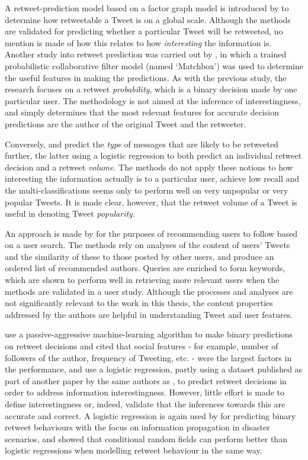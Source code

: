 A retweet-prediction model based on a factor graph model is introduced by \citet{yang10} to determine how retweetable a Tweet is on a global scale. Although the methods are validated for predicting whether a particular Tweet will be retweeted, no mention is made of how this relates to how \textit{interesting} the information is. Another study into retweet prediction was carried out by \citet{zaman10}, in which a trained probabilistic collaborative filter model (named `Matchbox') was used to determine the useful features in making the predictions. As with the previous study, the research focuses on a retweet \textit{probability}, which is a binary decision made by one particular user. The methodology is not aimed at the inference of interestingness, and simply determines that the most relevant features for accurate decision predictions are the author of the original Tweet and the retweeter.

Conversely, \citet{suh10} and \citet{hong11} predict the \textit{type} of messages that are likely to be retweeted further, the latter using a logistic regression to both predict an individual retweet decision and a retweet \textit{volume}. The methods do not apply these notions to how interesting the information actually is to a particular user, achieve low recall and the multi-classifications seems only to perform well on very unpopular or very popular Tweets. It is made clear, however, that the retweet volume of a Tweet is useful in denoting Tweet \textit{popularity}.

An approach is made by \citet{celebi12} for the purposes of recommending users to follow based on a user search. The methods rely on analyses of the content of users' Tweets and the similarity of these to those posted by other users, and produce an ordered list of recommended authors. Queries are enriched to form keywords, which are shown to perform well in retrieving more relevant users when the methods are validated in a user study. Although the processes and analyses are not significantly relevant to the work in this thesis, the content properties addressed by the authors are helpful in understanding Tweet and user features. 

\citet{petrovic11} use a passive-aggressive machine-learning algorithm to make binary predictions on retweet decisions and cited that social features - for example, number of followers of the author, frequency of Tweeting, etc. - were the largest factors in the performance, and \citet{naveed11} use a logistic regression, partly using a dataset published as part of another paper by the same authors as \citet{petrovic11}, to predict retweet decisions in order to address information interestingness. However, little effort is made to define interestingness or, indeed, validate that the inferences towards this are accurate and correct. A logistic regression is again used by \citet{zhu11} for predicting binary retweet behaviours with the focus on information propagation in disaster scenarios, and \citet{peng11} showed that conditional random fields can perform better than logistic regressions when modelling retweet behaviour in the same way.

